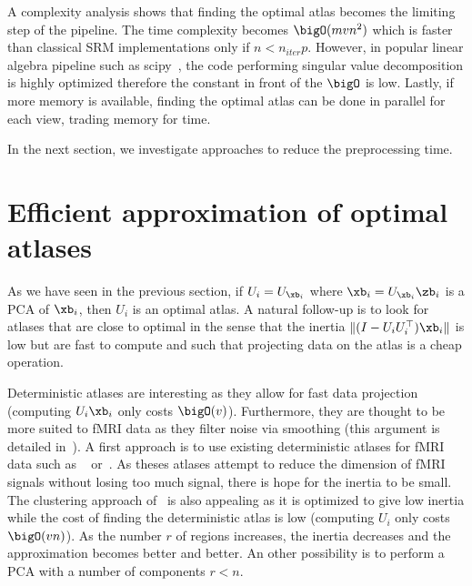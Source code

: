 A complexity analysis  shows that finding the optimal atlas becomes the limiting step of the pipeline. The time complexity becomes $\bigO(mvn^2)$ which is faster than classical SRM implementations only if $n < n_{iter} p$. However, in popular
linear algebra pipeline such as scipy~\cite{2020SciPy-NMeth}, the code
performing singular value decomposition is highly optimized therefore the
constant in front of the $\bigO$ is low. Lastly, if more memory is available, finding the optimal atlas can be done in parallel for each view, trading memory for time.

In the next section, we investigate approaches to reduce the preprocessing time.

\section{Efficient approximation of optimal atlases}
As we have seen in the previous section, if $U_i = U_{\xb_i}$ where $\xb_i =
U_{\xb_i} \zb_i$ is a PCA of $\xb_i$, then $U_i$ is an optimal atlas.
A natural follow-up is to look for atlases that are close to optimal in the
sense that the inertia $\| (I - U_i U_i^{\top}) \xb_i \|$ is low but are fast to
compute and such that projecting data on the atlas is a cheap operation.

Deterministic atlases are interesting as they allow for fast data projection
(computing $U_i \xb_i$ only costs $\bigO(v)$). Furthermore, they are thought to
be more suited to fMRI data as they filter noise via smoothing (this argument is
detailed in~\cite{hoyos2018recursive}).
A first approach is to use existing deterministic atlases for fMRI data such as 
~\cite{schaefer2017local} or~\cite{bellec2010multi}. As theses atlases
attempt to reduce the dimension of fMRI signals without losing too much signal,
there is hope for the inertia to be small.
The clustering approach
of~\cite{hoyos2018recursive} is also appealing as it is optimized to give low
inertia while the cost of finding the deterministic atlas is low (computing $U_i$ only costs
$\bigO(vn)$). As the number $r$ of regions increases, the inertia decreases
and the approximation becomes better and better. An other possibility is to
perform a PCA with a number of components $r < n$.

